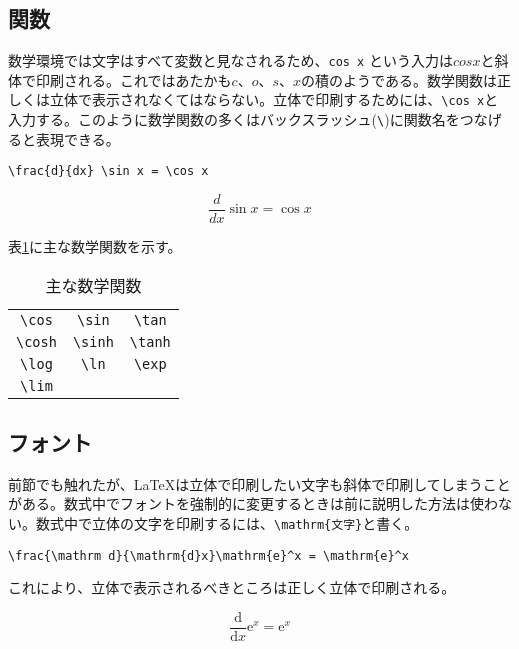 \subsection{関数}
\label{sec:latex:func}

数学環境では文字はすべて変数と見なされるため、\verb|cos x| という入力は\(cos x\)と斜体で印刷される。これではあたかも\(c\)、\(o\)、\(s\)、\(x\)の積のようである。数学関数は正しくは立体で表示されなくてはならない。立体で印刷するためには、\verb|\cos x|と入力する。このように数学関数の多くはバックスラッシュ(\texttt{\textbackslash})に関数名をつなげると表現できる。
\begin{reidai}
    \begin{verbatim}
\frac{d}{dx} \sin x = \cos x
\end{verbatim}
\end{reidai}
\vspace*{-1.5em}
\begin{kekka}
    \begin{equation*}
        \frac{d}{dx} \sin x = \cos x
    \end{equation*}
\end{kekka}
\noindent
表\ref{tab:func}に主な数学関数を示す。
\begin{table}[H]
    \centering
    \caption{主な数学関数}
    \label{tab:func}
    \begin{tabular}{ccc}
        \verb|\cos| & \verb|\sin| & \verb|\tan| \\
        \verb|\cosh| & \verb|\sinh| & \verb|\tanh| \\
        \verb|\log| & \verb|\ln| & \verb|\exp| \\
        \verb|\lim| &                         &                         \\
    \end{tabular}
\end{table}

\subsection{フォント}
\label{sec:latex:mathfont}

前節でも触れたが、\LaTeX は立体で印刷したい文字も斜体で印刷してしまうことがある。数式中でフォントを強制的に変更するときは前に説明した方法は使わない。数式中で立体の文字を印刷するには、\texttt{\textbackslash mathrm\{\textrm{文字}\}}と書く。
\begin{reidai}
    \begin{verbatim}
\frac{\mathrm d}{\mathrm{d}x}\mathrm{e}^x = \mathrm{e}^x
\end{verbatim}
\end{reidai}
\noindent これにより、立体で表示されるべきところは正しく立体で印刷される。
\begin{kekka}
    \begin{equation*}
        \frac{\mathrm d}{\mathrm{d}x}\mathrm{e}^x = \mathrm{e}^x
    \end{equation*}
\end{kekka}

